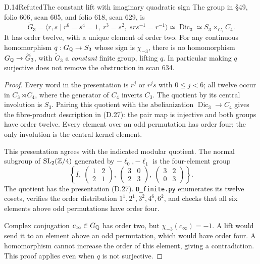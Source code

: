 \begin{statement}{D.14}{Refuted}{The constant lift with imaginary quadratic sign}
The group in \S49, folio 606, scan 605, and folio 618,
scan 629, is
\[
 \widetilde G_3=
 \langle r,s\mid r^6=s^4=1,\ r^3=s^2,\
                         srs^{-1}=r^{-1}\rangle
 \simeq \operatorname{Dic}_3
 \simeq S_3\times_{C_2}C_4.                                  \tag{D.27}
\]
It has order twelve, with a unique element of order two.
For any continuous homomorphism \(q:G_\mathbb Q\to S_3\) whose
sign is \(\chi_{-3}\), there is no homomorphism
\(G_\mathbb Q\to\widetilde G_3\), with \(\widetilde G_3\) a
\emph{constant} finite group, lifting \(q\).
In particular making \(q\) surjective does not remove the
obstruction in scan 634.
\end{statement}
\begin{proof}
Every word in the presentation is \(r^j\) or \(r^js\)
with \(0\le j<6\); all twelve occur in \(C_3\rtimes C_4\),
where the generator of \(C_4\) inverts \(C_3\).
The quotient by its central involution is \(S_3\).
Pairing this quotient with the abelianization
\(\operatorname{Dic}_3\to C_4\) gives the fibre-product
description in (D.27): the pair map is injective and both
groups have order twelve.
Every element over an odd permutation has order four;
the only involution is the central kernel element.

This presentation agrees with the indicated modular quotient.
The normal subgroup of \(\operatorname{SL}_2(\mathbb Z/4)\) generated by
\(-\ell_0,-\ell_1\) is the four-element group
\[
 \left\{I,\
 \begin{pmatrix}1&2\\2&1\end{pmatrix},\
 \begin{pmatrix}3&0\\2&3\end{pmatrix},\
 \begin{pmatrix}3&2\\0&3\end{pmatrix}\right\}.
 \tag{D.28}
\]
The quotient has the presentation (D.27).
\texttt{D\_finite.py} enumerates its twelve cosets, verifies
the order distribution
\(1^1,2^1,3^2,4^6,6^2\), and checks that all six elements
above odd permutations have order four.

Complex conjugation \(c_\infty\in G_\mathbb Q\) has order two,
but \(\chi_{-3}(c_\infty)=-1\).
A lift would send it to an element above an odd permutation,
which would have order four.  A homomorphism cannot increase
the order of this element, giving a contradiction.
This proof applies even when \(q\) is not surjective.
\end{proof}

